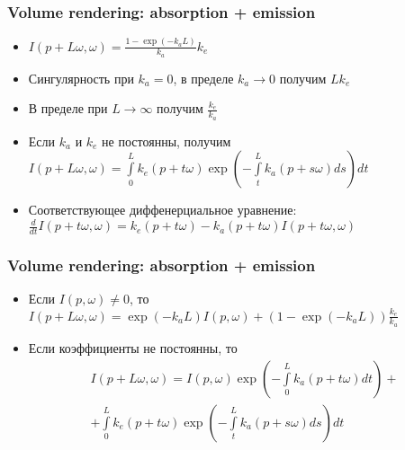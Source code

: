 \documentclass{beamer}
\begin{document}
\begin{frame}[fragile]
\frametitle{Volume rendering: absorption + emission}
\begin{itemize}
\item \begin{math}I(p+L\omega,\omega) = \frac{1 - \exp(-k_a L)}{k_a} k_e\end{math}
\pause
\item Сингулярность при \begin{math}k_a = 0\end{math}, в пределе \begin{math}k_a \rightarrow 0\end{math} получим \begin{math}L k_e\end{math}
\pause
\item В пределе при \begin{math}L \rightarrow \infty\end{math} получим \begin{math}\frac{k_e}{k_a}\end{math}
\pause
\item Если \begin{math}k_a\end{math} и \begin{math}k_e\end{math} не постоянны, получим \begin{math}I(p+L\omega,\omega) = \int\limits_0^L k_e(p+t\omega) \exp\left( -\int\limits_t^L k_a(p+s\omega)ds \right)dt\end{math}
\pause
\item Соответствующее диффенерциальное уравнение: \begin{math}\frac{d}{dt}I(p+t\omega,\omega) = k_e(p+t\omega) - k_a(p+t\omega) I(p+t\omega,\omega)\end{math}
\end{itemize}
\end{frame}

\begin{frame}[fragile]
\frametitle{Volume rendering: absorption + emission}
\begin{itemize}
\item Если \begin{math}I(p,\omega) \neq 0\end{math}, то \begin{math}I(p+L\omega,\omega) = \exp(-k_a L)I(p,\omega) + (1 - \exp(-k_a L))\frac{k_e}{k_a}\end{math}
\pause
\item Если коэффициенты не постоянны, то \begin{multline}I(p+L\omega,\omega) = I(p,\omega)\exp\left(-\int\limits_0^L k_a(p+t\omega)dt\right) +\\
+ \int\limits_0^L k_e(p+t\omega) \exp\left( -\int\limits_t^L k_a(p+s\omega)ds \right)dt\end{multline}
\end{itemize}
\end{frame}
\end{document}
